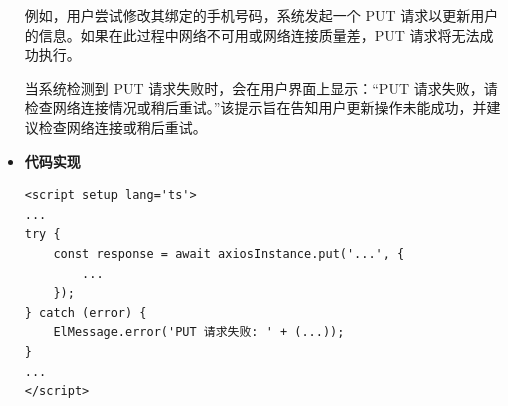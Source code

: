 \begin{itemize}
	例如，用户尝试修改其绑定的手机号码，系统发起一个 PUT 请求以更新用户的信息。如果在此过程中网络不可用或网络连接质量差，PUT 请求将无法成功执行。
	
	当系统检测到 PUT 请求失败时，会在用户界面上显示：“PUT 请求失败，请检查网络连接情况或稍后重试。”该提示旨在告知用户更新操作未能成功，并建议检查网络连接或稍后重试。
	
	\item \textbf{代码实现}
	\begin{verbatim}
<script setup lang='ts'>
...
try {
	const response = await axiosInstance.put('...', {
		...
	});
} catch (error) {
	ElMessage.error('PUT 请求失败: ' + (...));
}
...
</script>
	\end{verbatim}
\end{itemize}
